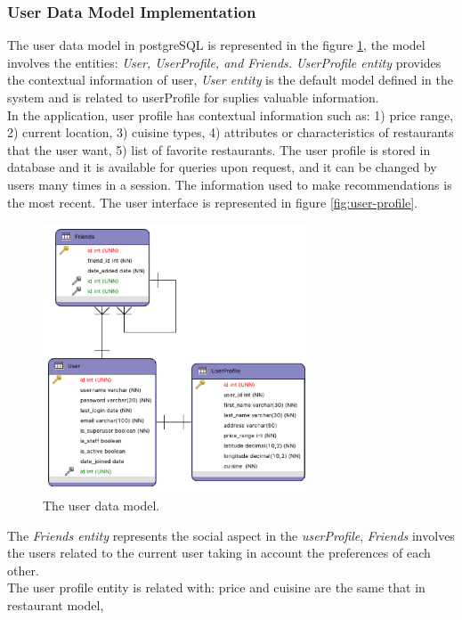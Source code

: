 \subsubsection{User Data Model Implementation} 

The user data model in postgreSQL is represented in the figure
\ref{fig:datausermodel}, the model involves the entities:
\textit{User, UserProfile, and Friends.} \textit{UserProfile entity}
provides the contextual information of user, \textit{User entity} is
the default model defined in the system and is related to userProfile
for suplies valuable information. \\
In the application, user profile has contextual
information such as: 1) price range, 2) current location, 3) cuisine
types, 4) attributes or characteristics of restaurants that the user want, 
5) list of  favorite restaurants.  
The user profile is stored in database and it is available for 
queries upon request, and it can be changed by users many times 
in a session. The information used to make recommendations 
is the most recent. The user interface is represented in 
figure \ref{fig:user-profile}.
\begin{figure}
\captionsetup{font=footnotesize}
\centering
\includegraphics[width=8cm,height=8cm,keepaspectratio]
{img/data-usermodel.png}
\caption{The user data model.}
\label{fig:datausermodel}     
\end{figure}
The \textit{Friends entity}
represents the social aspect in the \textit{userProfile}, \textit{Friends} involves
the users related to the current user taking in account the
preferences of each other. \\The user profile entity is related with: 
price and cuisine are the same that in restaurant model,
